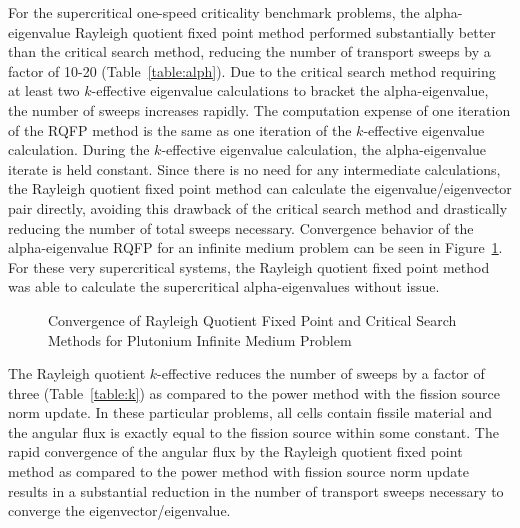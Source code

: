 For the supercritical one-speed criticality benchmark problems, the alpha-eigenvalue Rayleigh quotient fixed point method performed substantially better than the critical search method, reducing the number of transport sweeps by a factor of 10-20 (Table~\ref{table:alph}). Due to the critical search method requiring at least two $k$-effective eigenvalue calculations to bracket the alpha-eigenvalue, the number of sweeps increases rapidly. The computation expense of one iteration of the RQFP method is the same as one iteration of the $k$-effective eigenvalue calculation. During the $k$-effective eigenvalue calculation, the alpha-eigenvalue iterate is held constant. Since there is no need for any intermediate calculations, the Rayleigh quotient fixed point method can calculate the eigenvalue/eigenvector pair directly, avoiding this drawback of the critical search method and drastically reducing the number of total sweeps necessary. Convergence behavior of the alpha-eigenvalue RQFP for an infinite medium problem can be seen in Figure~\ref{fig:AlphaInfConv}. For these very supercritical systems, the Rayleigh quotient fixed point method was able to calculate the supercritical alpha-eigenvalues without issue.

\begin{figure}[]
	\centering
	\resizebox{!}{0.5\textheight}{
		
	}
	\caption{Convergence of Rayleigh Quotient Fixed Point and Critical Search Methods for Plutonium Infinite Medium Problem}
	\label{fig:AlphaInfConv}
\end{figure}

The Rayleigh quotient $k$-effective reduces the number of sweeps by a factor of three (Table~\ref{table:k}) as compared to the power method with the fission source norm update. In these particular problems, all cells contain fissile material and the angular flux is exactly equal to the fission source within some constant. The rapid convergence of the angular flux by the Rayleigh quotient fixed point method as compared to the power method with fission source norm update results in a substantial reduction in the number of transport sweeps necessary to converge the eigenvector/eigenvalue.

